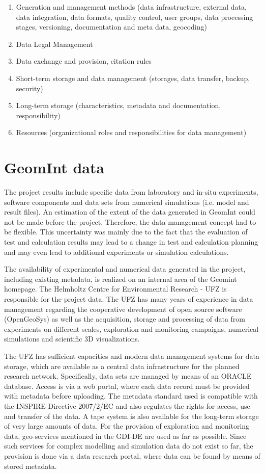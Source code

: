 \begin{enumerate}{\leftmargin=1em \itemindent=0em \itemsep=0.2em}
\item Generation and management methods (data infrastructure, external data, data integration, data formats, quality control, user groups, data processing stages, versioning, documentation and meta data, geocoding)
\item Data Legal Management
\item Data exchange and provision, citation rules
\item Short-term storage and data management (storages, data transfer, backup, security)
\item Long-term storage (characteristics, metadata and documentation, responsibility)
\item Resources (organizational roles and responsibilities for data management)
\end{enumerate}

\section{GeomInt data}

The project results include specific data from laboratory and in-situ experiments, software components and data sets from numerical simulations (i.e. model and result files). An estimation of the extent of the data generated in GeomInt could not be made before the project. Therefore, the data management concept had to be flexible. This uncertainty was mainly due to the fact that the evaluation of test and calculation results may lead to a change in test and calculation planning and may even lead to additional experiments or simulation calculations. 

The availability of experimental and numerical data generated in the project, including existing metadata, is realized on an internal area of the Geomint homepage. The Helmholtz Centre for Environmental Research - UFZ is responsible for the project data. The UFZ has many years of experience in data management regarding the cooperative development of open source software (OpenGeoSys) as well as the acquisition, storage and processing of data from experiments on different scales, exploration and monitoring campaigns, numerical simulations and scientific 3D visualizations. 

The UFZ has sufficient capacities and modern data management systems for data storage, which are available as a central data infrastructure for the planned research network. Specifically, data sets are managed by means of an ORACLE database. Access is via a web portal, where each data record must be provided with metadata before uploading. The metadata standard used is compatible with the INSPIRE Directive 2007/2/EC and also regulates the rights for access, use and transfer of the data. A tape system is also available for the long-term storage of very large amounts of data. For the provision of exploration and monitoring data, geo-services mentioned in the GDI-DE are used as far as possible. Since such services for complex modelling and simulation data do not exist so far, the provision is done via a data research portal, where data can be found by means of stored metadata.

